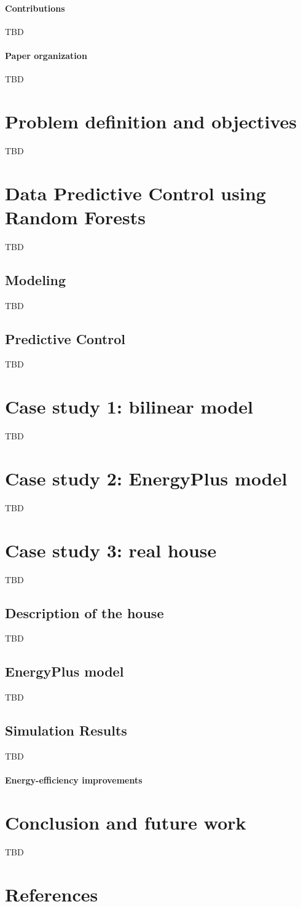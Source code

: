 \documentclass[review]{elsarticle}
\begin{document}
\paragraph{Contributions} TBD

\paragraph{Paper organization} TBD

\section{Problem definition and objectives} TBD

\section{Data Predictive Control using Random Forests} TBD

\subsection{Modeling} TBD

\subsection{Predictive Control} TBD

\section{Case study 1: bilinear model} TBD

\section{Case study 2: EnergyPlus model} TBD

\section{Case study 3: real house} TBD

\subsection{Description of the house} TBD

\subsection{EnergyPlus model} TBD

\subsection{Simulation Results} TBD

\paragraph{Energy-efficiency improvements}

\section{Conclusion and future work} TBD

\section*{References}


\end{document}
